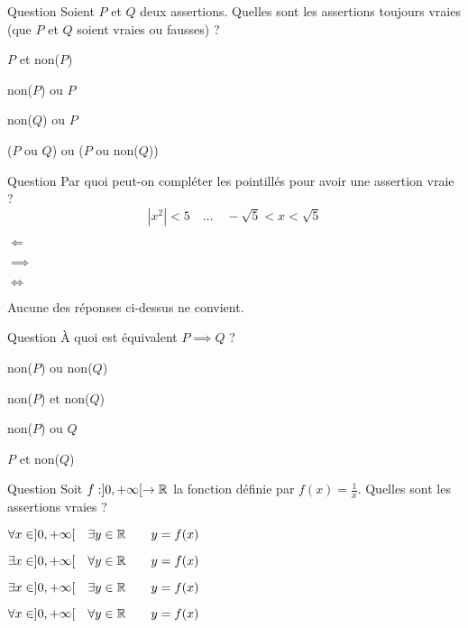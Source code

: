 \begin{multi}[multiple,feedback=
{On appelle une tautologie une assertion toujours vraie. C'est par exemple le cas de "non(\(P\)) ou \(P\)", si \(P\) est vraie, l'assertion est vraie, si \(P\) est fausse, l'assertion est encore vraie !
}]{Question}
Soient \(P\) et \(Q\) deux assertions. Quelles sont les assertions toujours vraies (que \(P\) et \(Q\) soient vraies ou fausses)  ?

    \item \(P\) et non(\(P\))
    \item* non(\(P\)) ou \(P\)
    \item non(\(Q\)) ou \(P\)
    \item* (\(P\) ou \(Q\)) ou (\(P\) ou non(\(Q\)))
\end{multi}


\begin{multi}[multiple,feedback=
{C'est une équivalence, donc en particulier les implications dans les deux sens sont vraies !
}]{Question}
Par quoi peut-on compléter les pointillés pour avoir une assertion vraie ?
\[|x^2| < 5 \quad \ldots \quad -\sqrt{5} < x < \sqrt{5}\]

    \item* \(\Longleftarrow\)
    \item* \(\implies\)
    \item* \(\iff\)
    \item Aucune des réponses ci-dessus ne convient.
\end{multi}


\begin{multi}[multiple,feedback=
{La définition (à connaître) de "\(P \implies Q\)" est "non(\(P\)) ou \(Q\)".
}]{Question}
À quoi est équivalent \(P \implies Q\) ?

    \item non(\(P\)) ou non(\(Q\))
    \item non(\(P\)) et non(\(Q\))
    \item* non(\(P\)) ou \(Q\)
    \item \(P\) et non(\(Q\))
\end{multi}


\begin{multi}[multiple,feedback=
{L'ordre des "pour tout" et "il existe" est très important.
}]{Question}
Soit \(f : ]0,+\infty[ \to \mathbb{R}\) la fonction définie par \(f(x) = \frac{1}{x}\). Quelles sont les assertions vraies ?

    \item* \(\forall x \in ]0,+\infty[ \quad \exists y \in \mathbb{R} \qquad y = f(x)\)
    \item \(\exists x \in ]0,+\infty[ \quad \forall y \in \mathbb{R} \qquad y = f(x)\)
    \item* \(\exists x \in ]0,+\infty[ \quad \exists y \in \mathbb{R} \qquad y = f(x)\)
    \item \(\forall x \in ]0,+\infty[ \quad \forall y \in \mathbb{R} \qquad y = f(x)\)
\end{multi}


